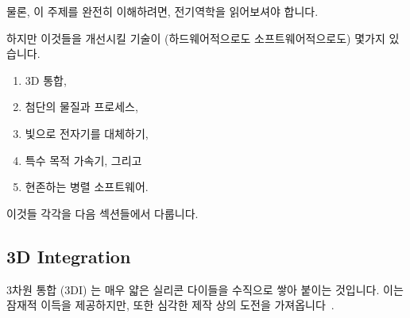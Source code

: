 {\begin{enumerate}
	\fi

	\end{enumerate}

	물론, 이 주제를 완전히 이해하려면, 전기역학을 읽어보셔야 합니다.

	\iffalse

	Of course, to fully understand this topic, you should read
	up on electrodynamics.

	\fi

}\QuickQuizEnd

하지만 이것들을 개선시킬 기술이 (하드웨어적으로도 소프트웨어적으로도) 몇가지
있습니다.

\begin{enumerate}
\item	3D 통합,
\item	첨단의 물질과 프로세스,
\item	빛으로 전자기를 대체하기,
\item	특수 목적 가속기, 그리고
\item	현존하는 병렬 소프트웨어.
\end{enumerate}

이것들 각각을 다음 섹션들에서 다룹니다.

\iffalse

There are nevertheless some technologies (both hardware and software)
that might help improve matters:

\begin{enumerate}
\item	3D integration,
\item	Novel materials and processes,
\item	Substituting light for electricity,
\item	Special-purpose accelerators, and
\item	Existing parallel software.
\end{enumerate}

Each of these is described in one of the following sections.

\fi

\subsection{3D Integration}
\label{sec:cpu:3D Integration}

3차원 통합 (3DI) 는 매우 얇은 실리콘 다이들을 수직으로 쌓아 붙이는 것입니다.
이는 잠재적 이득을 제공하지만, 또한 심각한 제작 상의 도전을
가져옵니다~\cite{JohnKnickerbocker2008:3DI}.

\iffalse

